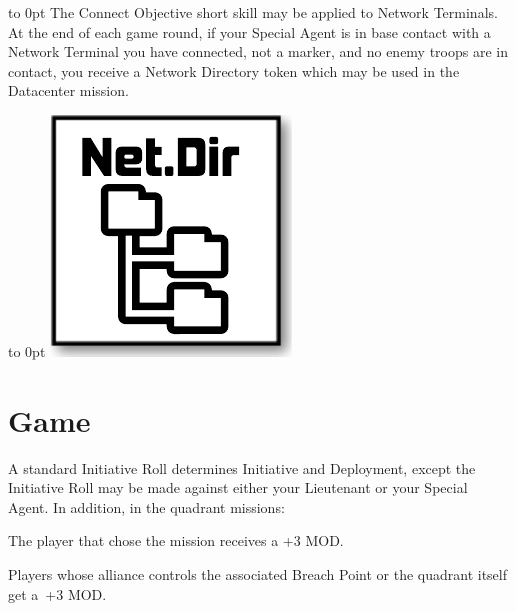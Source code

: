 \medskip%
\noindent\begin{minipage}[t]{\linewidth-0.75in-2em}\vbox to 0pt{}
    The Connect Objective short skill
  may be applied to Network Terminals.  At the end of each game round,
  if your Special Agent is in base contact with a Network Terminal you
  have connected, not a marker, and no enemy troops are in contact,
  you receive a Network Directory token which may be used in the
  Datacenter mission.
\end{minipage}\hfill
\begin{minipage}[t]{0.75in}\vbox to 0pt{}
\includegraphics[width=\linewidth]{art/icons/directory2}
\end{minipage}

\section{Game}

  A standard Initiative Roll determines
Initiative and Deployment, except the Initiative Roll may be made
against either your Lieutenant or your Special Agent.  In addition, in
the quadrant missions:

\begin{squishitemize}
\item The player that chose the mission receives a +3 MOD.

\item Players whose alliance controls the associated Breach Point or
  the quadrant itself get a~+3 MOD.
\end{squishitemize}

